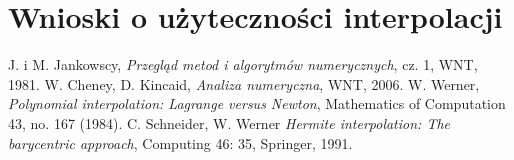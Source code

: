 \documentclass[10pt,wide]{mwart}
\theoremstyle{definition}
\begin{document}
\section{Wnioski o użyteczności interpolacji }


\begin{thebibliography}{9}
\itemsep10pt
 J. i M. Jankowscy, \emph{Przegląd metod i algorytmów numerycznych}, cz. 1, WNT, 1981.
 W. Cheney, D. Kincaid, \emph{Analiza numeryczna}, WNT, 2006.
 W. Werner, \emph{Polynomial interpolation: Lagrange versus Newton}, Mathematics of Computation 43, no. 167 (1984).
 C. Schneider, W. Werner \emph{Hermite interpolation: The barycentric approach}, Computing 46: 35, Springer, 1991.
\end{thebibliography}
\end{document}
